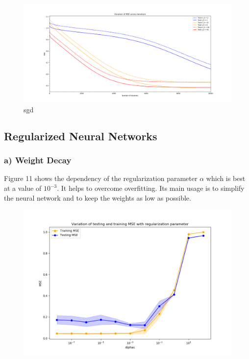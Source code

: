 \begin{figure}[!htbp]
	\centering
        \includegraphics[width=14cm]{1_1_d_sgd_rs0}
	\caption{sgd}
\end{figure}

\newpage

\subsection{Regularized Neural Networks}

\subsubsection*{a) Weight Decay}
Figure 11 shows the dependency of the regularization parameter $\alpha$ which is best at a value of $10^{-3}$. It helps to overcome overfitting. Its main usage is to simplify the neural network and to keep the weights as low as possible.
\begin{figure}[!htbp]
	\centering
        \includegraphics[width=14cm]{1_2_a}
	\caption{}
\end{figure}

